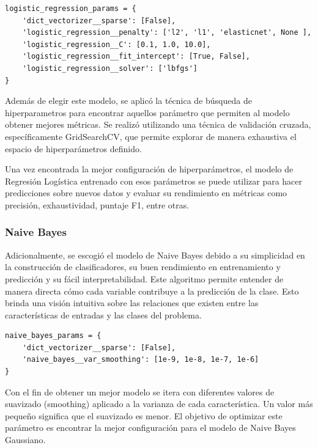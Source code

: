 \documentclass[11pt,a4paper,spanish]{book}
\numberwithin{equation}{chapter}
\numberwithin{figure}{chapter}
\begin{document}
\vspace{5mm}
\begin{lstlisting}
logistic_regression_params = {
    'dict_vectorizer__sparse': [False],
    'logistic_regression__penalty': ['l2', 'l1', 'elasticnet', None ],
    'logistic_regression__C': [0.1, 1.0, 10.0],
    'logistic_regression__fit_intercept': [True, False],
    'logistic_regression__solver': ['lbfgs']
}
\end{lstlisting}


Además de elegir este modelo, se aplicó la técnica de búsqueda de hiperparametros para 
encontrar aquellos parámetro que permiten al modelo obtener mejores métricas. Se realizó 
utilizando una técnica de validación cruzada, específicamente GridSearchCV, que permite 
explorar de manera exhaustiva el espacio de hiperparámetros definido.

Una vez encontrada la mejor configuración de hiperparámetros, el modelo de Regresión 
Logística entrenado con esos parámetros se puede utilizar para hacer predicciones sobre 
nuevos datos y evaluar su rendimiento en métricas como precisión, exhaustividad, 
puntaje F1, entre otras.


\subsubsection{Naive Bayes}

Adicionalmente, se escogió el modelo de Naive Bayes debido a su simplicidad en la 
construcción de clasificadores, su buen rendimiento en entrenamiento y predicción y su 
fácil interpretabilidad. Este algoritmo permite entender de 
manera directa cómo cada variable contribuye a la predicción de la clase. Esto brinda 
una visión intuitiva sobre las relaciones que existen entre las características de 
entradas y las clases del problema.


\vspace{5mm}
\begin{lstlisting}
naive_bayes_params = {
    'dict_vectorizer__sparse': [False],
    'naive_bayes__var_smoothing': [1e-9, 1e-8, 1e-7, 1e-6]
}
\end{lstlisting}


Con el fin de obtener un mejor modelo se itera con diferentes valores de suavizado 
(smoothing) aplicado a la varianza de cada característica. Un valor más pequeño 
significa que el suavizado es menor.  El objetivo de optimizar este parámetro es 
encontrar la mejor configuración para el modelo de Naive Bayes Gaussiano.
\end{document}
